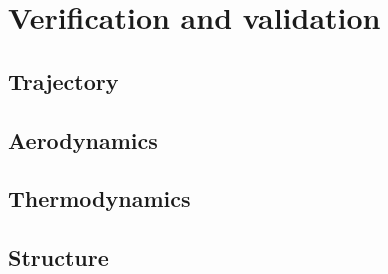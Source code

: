 \section{Verification and validation}

\subsection{Trajectory} \label{sec:VandVtraj}


\subsection{Aerodynamics} \label{sec:VandVaero}


\subsection{Thermodynamics} \label{sec:VandVthermo}


\subsection{Structure} \label{sec:VandVstruc}




